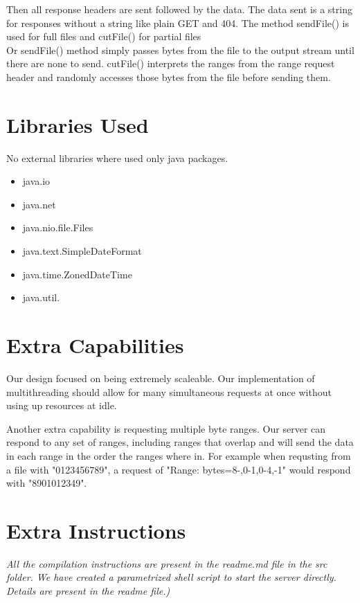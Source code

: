 \documentclass[11pt, letterpaper]{report}
\begin{document}
Then all response headers are sent followed by the data. The data sent is a string for responses without a string like plain GET and 404. The method sendFile() is used for full files and cutFile() for partial files \\

Or sendFile() method simply passes bytes from the file to the output stream until there are none to send. cutFile() interprets the ranges from the range request header and randomly accesses those bytes from the file before sending them.
\section{Libraries Used}
No external libraries where used only java packages.
\begin{itemize}
    \item java.io
    \item java.net
    \item java.nio.file.Files
    \item java.text.SimpleDateFormat
    \item java.time.ZonedDateTime
    \item java.util.
\end{itemize}

\section{Extra Capabilities}
Our design focused on being extremely scaleable. Our implementation of multithreading should allow for many simultaneous requests at once without using up resources at idle.

Another extra capability is requesting multiple byte ranges. Our server can respond to any set of ranges, including ranges that overlap and will send the data in each range in the order the ranges where in. For example when requsting from a file with "0123456789", a request of "Range: bytes=8-,0-1,0-4,-1" would respond with "8901012349".

\section{Extra Instructions}
\textit{All the compilation instructions are present in the readme.md file in the src folder. We have created a parametrized shell script to start the server directly. Details are present in the readme file.)}
\end{document}
